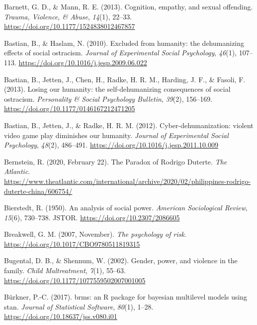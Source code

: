 \documentclass[
  donotrepeattitle,doc, 12pt, a4paper,floatsintext]{apa7}
\newlength{\cslhangindent}
\newlength{\cslentryspacingunit} %
\newenvironment{CSLReferences}[2] %
 {%
  \setlength{\parindent}{0pt}
  \ifodd #1
  \let\oldpar\par
  \def\par{\hangindent=\cslhangindent\oldpar}
  \fi
  \setlength{\parskip}{#2\cslentryspacingunit}
 }%
 {}
\begin{document}
\begin{CSLReferences}{1}{0}
\leavevmode{}%
Barnett, G. D., \& Mann, R. E. (2013). Cognition, empathy, and sexual offending. \emph{Trauma, Violence, \& Abuse}, \emph{14}(1), 22--33. \url{https://doi.org/10.1177/1524838012467857}

\leavevmode{}%
Bastian, B., \& Haslam, N. (2010). Excluded from humanity: the dehumanizing effects of social ostracism. \emph{Journal of Experimental Social Psychology}, \emph{46}(1), 107--113. \url{https://doi.org/10.1016/j.jesp.2009.06.022}

\leavevmode{}%
Bastian, B., Jetten, J., Chen, H., Radke, H. R. M., Harding, J. F., \& Fasoli, F. (2013). Losing our humanity: the self-dehumanizing consequences of social ostracism. \emph{Personality \& Social Psychology Bulletin}, \emph{39}(2), 156--169. \url{https://doi.org/10.1177/0146167212471205}

\leavevmode{}%
Bastian, B., Jetten, J., \& Radke, H. R. M. (2012). Cyber-dehumanization: violent video game play diminishes our humanity. \emph{Journal of Experimental Social Psychology}, \emph{48}(2), 486--491. \url{https://doi.org/10.1016/j.jesp.2011.10.009}

\leavevmode{}%
Bernstein, R. (2020, February 22). The Paradox of Rodrigo Duterte. \emph{The Atlantic}. \url{https://www.theatlantic.com/international/archive/2020/02/philippines-rodrigo-duterte-china/606754/}

\leavevmode{}%
Bierstedt, R. (1950). An analysis of social power. \emph{American Sociological Review}, \emph{15}(6), 730--738. JSTOR. \url{https://doi.org/10.2307/2086605}

\leavevmode{}%
Breakwell, G. M. (2007, November). \emph{The psychology of risk}. \url{https://doi.org/10.1017/CBO9780511819315}

\leavevmode{}%
Bugental, D. B., \& Shennum, W. (2002). Gender, power, and violence in the family. \emph{Child Maltreatment}, \emph{7}(1), 55--63. \url{https://doi.org/10.1177/1077559502007001005}

\leavevmode{}%
Bürkner, P.-C. (2017). brms: an R package for bayesian multilevel models using stan. \emph{Journal of Statistical Software}, \emph{80}(1), 1--28. \url{https://doi.org/10.18637/jss.v080.i01}


\end{CSLReferences}
\end{document}
